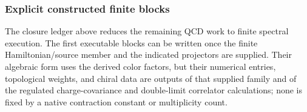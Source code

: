\documentclass[12pt,a4paper]{article}
\begin{document}
\subsubsection{Explicit constructed finite blocks}
\label{p11:subsec:explicit-constructed-finite-blocks}

The closure ledger above reduces the remaining QCD work to finite spectral
execution.  The first executable blocks can be written once the finite
Hamiltonian/source member and the indicated projectors are supplied.  Their
algebraic form uses the derived color factors, but their numerical entries,
topological weights, and chiral data are outputs of that supplied family and
of the regulated charge-covariance and double-limit correlator calculations;
none is fixed by a native contraction constant or multiplicity count.
\end{document}
